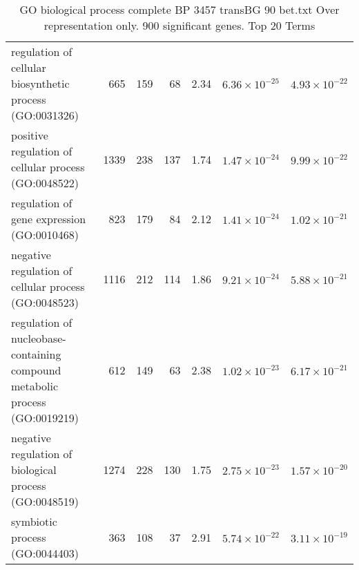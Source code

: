 \begin{table}[ht]
\begin{adjustbox}{width=\textwidth}
\begin{tabular}{lrrrlrr}
  regulation of cellular biosynthetic process (GO:0031326) & 665 & 159 & 68 & 2.34 & $6.36 \times 10^{-25}$ & $4.93 \times 10^{-22}$ \\ 
  positive regulation of cellular process (GO:0048522) & 1339 & 238 & 137 & 1.74 & $1.47 \times 10^{-24}$ & $9.99 \times 10^{-22}$ \\ 
  regulation of gene expression (GO:0010468) & 823 & 179 & 84 & 2.12 & $1.41 \times 10^{-24}$ & $1.02 \times 10^{-21}$ \\ 
  negative regulation of cellular process (GO:0048523) & 1116 & 212 & 114 & 1.86 & $9.21 \times 10^{-24}$ & $5.88 \times 10^{-21}$ \\ 
  regulation of nucleobase-containing compound metabolic process (GO:0019219) & 612 & 149 & 63 & 2.38 & $1.02 \times 10^{-23}$ & $6.17 \times 10^{-21}$ \\ 
  negative regulation of biological process (GO:0048519) & 1274 & 228 & 130 & 1.75 & $2.75 \times 10^{-23}$ & $1.57 \times 10^{-20}$ \\ 
  symbiotic process (GO:0044403) & 363 & 108 & 37 & 2.91 & $5.74 \times 10^{-22}$ & $3.11 \times 10^{-19}$ \\ 
   \hline
\end{tabular}
\end{adjustbox}
\caption{GO biological process complete BP 3457 transBG 90 bet.txt Over representation only. 900 significant genes. Top 20 Terms} 
\label{tab:GO biological process complete BP 3457 transBG 90 bet.txt Over representation only. 900 significant genes. Top 20 Terms}
\end{table}



